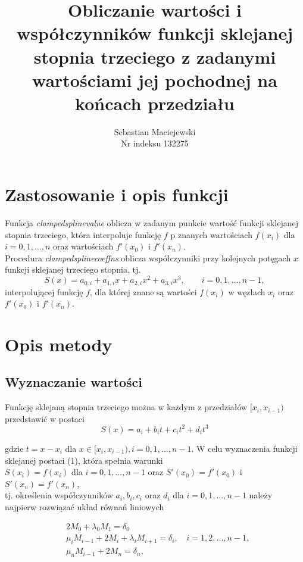 \documentclass[a4paper, 10pt]{article}
\title{Obliczanie wartości i współczynników funkcji sklejanej stopnia trzeciego z zadanymi
wartościami jej pochodnej na końcach przedziału}
\author{Sebastian Maciejewski \\Nr indeksu 132275}
\begin{document}
\maketitle

\section{Zastosowanie i opis funkcji}

Funkcja \textit{clampedsplinevalue} oblicza w zadanym punkcie wartość funkcji sklejanej stopnia trzeciego, która interpoluje funkcję $f$ p znanych wartościach $f(x_i)$ dla $i = 0, 1, ..., n$
oraz wartościach $f'(x_0)$ i $f'(x_n)$. \\

\noindent Procedura \textit{clampedsplinecoeffns} oblicza współczynniki przy kolejnych potęgach $x$ funkcji sklejanej trzeciego stopnia, tj. 
$$ S(x) = a_{0,i} + a_{1,i}x + a_{2,i}x^2 + a_{3,i}x^3, \qquad  i=0,1,...,n-1, $$
interpolującej funkcję $f$, dla której znane są wartości $f(x_i)$ w węzłach $x_i$ oraz $f'(x_0)$ i $f'(x_n)$.

\section{Opis metody}

\subsection*{Wyznaczanie wartości}

Funkcję sklejaną stopnia trzeciego można w każdym z przedziałów $[x_i,x_{i-1})$ przedstawić w postaci
\begin{equation}
S(x) = a_i + b_i t+c_i t^2 + d_i t^3
\end{equation}

gdzie $t=x-x_i$ dla $x \in [x_i,x_{i-1}), i=0,1,...,n-1$. W celu wyznaczenia funkcji sklejanej
postaci (1), która spełnia warunki\\

$S(x_i) = f(x_i)$ dla $i = 0,1,...,n-1$ oraz $S'(x_0) = f'(x_0)$ i $S'(x_n) = f'(x_n)$,\\ 

tj. określenia współczynników $a_i , b_i , c_i$ oraz $d_i$ dla $i = 0,1,...,n-1$ należy najpierw rozwiązać układ równań liniowych

\begin{equation}
\begin{split}
&2M_0 + \lambda_0 M_1 = \delta_0\\
&\mu_i M_{i-1} + 2M_i + \lambda_i M_{i+1} = \delta_i, \quad i= 1,2,...,n-1,\\
&\mu_n M_{i-1} + 2M_n = \delta_n,
\end{split}
\end{equation}
\end{document}
